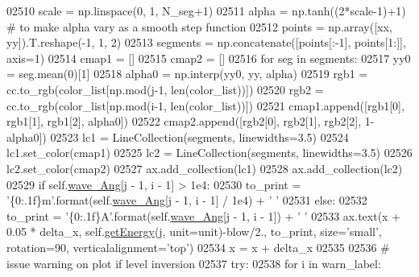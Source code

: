 \begin{DoxyCode}
{{{{{{{{{{{{{{{{{{{{{{02510                     scale = np.linspace(0, 1, N\_seg+1)
02511                     alpha =  np.tanh((2*scale-1)+1)  \textcolor{comment}{# to make alpha vary as a smooth step function}
02512                     points = np.array([xx, yy]).T.reshape(-1, 1, 2) 
02513                     segments = np.concatenate([points[:-1], points[1:]], axis=1) 
02514                     cmap1 = []
02515                     cmap2 = []
02516                     \textcolor{keywordflow}{for} seg \textcolor{keywordflow}{in} segments:
02517                             yy0 = seg.mean(0)[1] 
02518                             alpha0 = np.interp(yy0, yy, alpha)
02519                             rgb1 = cc.to\_rgb(color\_list[np.mod(j-1, len(color\_list))]) 
02520                             rgb2 = cc.to\_rgb(color\_list[np.mod(i-1, len(color\_list))]) 
02521                             cmap1.append([rgb1[0], rgb1[1], rgb1[2], alpha0]) 
02522                             cmap2.append([rgb2[0], rgb2[1], rgb2[2], 1-alpha0])
02523                     lc1 = LineCollection(segments, linewidths=3.5)
02524                     lc1.set\_color(cmap1) 
02525                     lc2 = LineCollection(segments, linewidths=3.5)
02526                     lc2.set\_color(cmap2) 
02527                     ax.add\_collection(lc1) 
02528                     ax.add\_collection(lc2) 
02529                     \textcolor{keywordflow}{if} self.\hyperlink{classpyneb_1_1core_1_1pynebcore_1_1_atom_a044e1349bb63766a5f3d25fbf04b5c2c}{wave\_Ang}[j - 1, i - 1] > 1e4:
02530                         to\_print = \textcolor{stringliteral}{'\{0:.1f\}m'}.format(self.\hyperlink{classpyneb_1_1core_1_1pynebcore_1_1_atom_a044e1349bb63766a5f3d25fbf04b5c2c}{wave\_Ang}[j - 1, i - 1] / 1e4) + \textcolor{stringliteral}{' '}
02531                     \textcolor{keywordflow}{else}:
02532                         to\_print = \textcolor{stringliteral}{'\{0:.1f\}A'}.format(self.\hyperlink{classpyneb_1_1core_1_1pynebcore_1_1_atom_a044e1349bb63766a5f3d25fbf04b5c2c}{wave\_Ang}[j - 1, i - 1]) + \textcolor{stringliteral}{' '}
02533                     ax.text(x + 0.05 * delta\_x, self.\hyperlink{classpyneb_1_1core_1_1pynebcore_1_1_atom_a9940acb2999e864edf9761d822e65d7f}{getEnergy}(j, unit=unit)-blow/2., to\_print, 
      size=\textcolor{stringliteral}{'small'}, rotation=90, verticalalignment=\textcolor{stringliteral}{'top'})
02534                     x = x + delta\_x
02535 
02536         \textcolor{comment}{# issue warning on plot if level inversion }
02537         \textcolor{keywordflow}{try}:
02538             \textcolor{keywordflow}{for} i \textcolor{keywordflow}{in} warn\_label:
}}}}}}}}}}}}}}}}}}}}}}
\end{DoxyCode}
